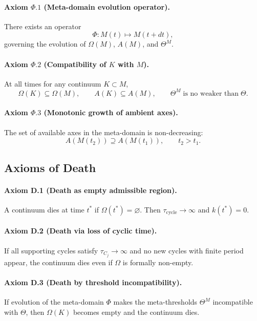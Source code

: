 \paragraph{Axiom \texorpdfstring{\(\Phi.1\)}{\Phi.1} (Meta-domain evolution operator).}
There exists an operator
\[
  \Phi : M(t)\mapsto M(t+dt),
\]
governing the evolution of \(\Omega(M)\), \(A(M)\), and \(\Theta^M\).

\paragraph{Axiom \texorpdfstring{\(\Phi.2\)}{\Phi.2} (Compatibility of \texorpdfstring{\(K\)}{K} with \texorpdfstring{\(M\)}{M}).}
At all times for any continuum \(K\subset M\),
\[
  \Omega(K)\subseteq \Omega(M),\qquad
  A(K)\subseteq A(M),\qquad
  \Theta^M\;\text{is no weaker than}\;\Theta.
\]

\paragraph{Axiom \texorpdfstring{\(\Phi.3\)}{\Phi.3} (Monotonic growth of ambient axes).}
The set of available axes in the meta-domain is non-decreasing:
\[
  A(M(t_2)) \supseteq A(M(t_1)),\qquad t_2>t_1.
\]

\subsection{Axioms of Death}

\paragraph{Axiom D.1 (Death as empty admissible region).}
A continuum dies at time \(t^*\) if \(\Omega(t^*)=\varnothing\).
Then \(\tau_{\mathrm{cycle}}\to\infty\) and \(k(t^*)=0\).

\paragraph{Axiom D.2 (Death via loss of cyclic time).}
If all supporting cycles satisfy \(\tau_{C_j}\to\infty\) and no new cycles with finite period appear, the continuum dies even if \(\Omega\) is formally non-empty.

\paragraph{Axiom D.3 (Death by threshold incompatibility).}
If evolution of the meta-domain \(\Phi\) makes the meta-thresholds \(\Theta^M\) incompatible with \(\Theta\), then \(\Omega(K)\) becomes empty and the continuum dies.

